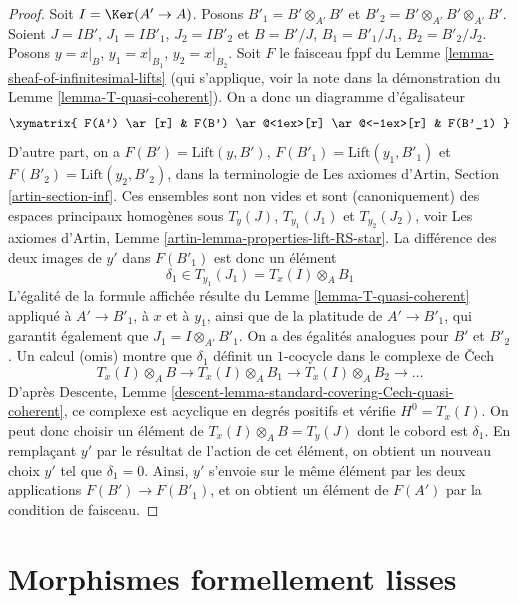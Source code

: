 \begin{proof}
Soit $I = \Ker(A' \to A)$. Posons $B'_1 = B' \otimes_{A'} B'$ et
$B'_2 = B' \otimes_{A'} B' \otimes_{A'} B'$. Soient
$J = IB'$, $J_1 = IB'_1$, $J_2 = IB'_2$ et
$B = B'/J$, $B_1 = B'_1/J_1$, $B_2 = B'_2/J_2$.
Posons $y = x|_B$, $y_1 = x|_{B_1}$, $y_2 = x|_{B_2}$.
Soit $F$ le faisceau fppf du
Lemme \ref{lemma-sheaf-of-infinitesimal-lifts}
(qui s'applique, voir la note dans la démonstration du
Lemme \ref{lemma-T-quasi-coherent}).
On a donc un diagramme d'égalisateur
$$
\xymatrix{
F(A') \ar[r] &
F(B') \ar@<1ex>[r] \ar@<-1ex>[r] &
F(B'_1)
}
$$
D'autre part, on a $F(B') = \text{Lift}(y, B')$,
$F(B'_1) = \text{Lift}(y_1, B'_1)$ et $F(B'_2) = \text{Lift}(y_2, B'_2)$,
dans la terminologie de Les axiomes d'Artin, Section \ref{artin-section-inf}.
Ces ensembles sont non vides et sont (canoniquement) des espaces principaux homogènes sous
$T_y(J)$, $T_{y_1}(J_1)$ et $T_{y_2}(J_2)$, voir
Les axiomes d'Artin, Lemme \ref{artin-lemma-properties-lift-RS-star}.
La différence des deux images de $y'$ dans
$F(B'_1)$ est donc un élément
$$
\delta_1 \in T_{y_1}(J_1) = T_x(I) \otimes_A B_1
$$
L'égalité de la formule affichée résulte du
Lemme \ref{lemma-T-quasi-coherent} appliqué à
$A' \to B'_1$, à $x$ et à $y_1$, ainsi que de la platitude de $A' \to B'_1$,
qui garantit également que $J_1 = I \otimes_{A'} B'_1$. On a des
égalités analogues pour $B'$ et $B'_2$.
Un calcul (omis) montre que $\delta_1$ définit
un $1$-cocycle dans le complexe de {\v C}ech
$$
T_x(I) \otimes_A B \to
T_x(I) \otimes_A B_1 \to
T_x(I) \otimes_A B_2 \to \ldots
$$
D'après Descente, Lemme \ref{descent-lemma-standard-covering-Cech-quasi-coherent},
ce complexe est acyclique en degrés positifs et vérifie $H^0 = T_x(I)$.
On peut donc choisir un élément de $T_x(I) \otimes_A B = T_y(J)$
dont le cobord est $\delta_1$. En remplaçant $y'$ par le résultat
de l'action de cet élément, on obtient un nouveau choix $y'$ tel que $\delta_1 = 0$.
Ainsi, $y'$ s'envoie sur le même élément par les deux applications
$F(B') \to F(B'_1)$, et on obtient un élément de $F(A')$ par
la condition de faisceau.
\end{proof}












\section{Morphismes formellement lisses}
\label{section-formally-smooth}

